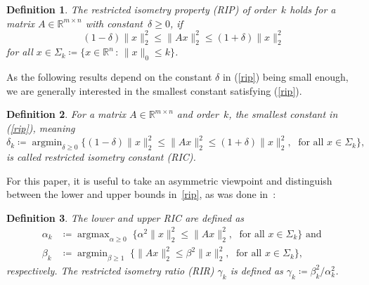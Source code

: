 \documentclass[journal]{IEEEtran}
\newtheorem{definition}{Definition}
\DeclareMathOperator*{\argmin}{argmin}
\DeclareMathOperator*{\argmax}{argmax}
\newcommand{\suchthat}{\,:\,}
\newcommand{\define}{\coloneqq}
\newcommand{\Norm}[2]{\lVert{#1}\rVert_{#2}}
\newcommand{\R}{\mathds{R}}
\begin{document}
\begin{definition}\label{ripdef}
  The \emph{restricted isometry property} (RIP) of order~$k$ holds for a
  matrix $A \in \R^{m \times n}$ with constant~$\delta \geq 0$, if
  \begin{equation}\label{rip}
    (1 - \delta) \Norm{x}{2}^2 \leq \Norm{Ax}{2}^2 \leq (1+\delta) \Norm{x}{2}^2
  \end{equation}
  for all $x \in \Sigma_k \define \{x \in \R^n \suchthat \Norm{x}{0} \leq k\}$.
\end{definition}

As the following results depend on the constant $\delta$ in (\ref{rip}) being
small enough, we are generally interested in the smallest constant satisfying
(\ref{rip}).

\begin{definition}\label{ricdef}
For a matrix $A \in \R^{m \times n}$ and order~$k$, the smallest constant in 
(\ref{rip}), meaning
\begin{equation}\label{ric}
 \delta_k \define \argmin_{\delta \geq 0} \{(1 - \delta) \Norm{x}{2}^2 \leq \Norm{Ax}{2}^2 \leq (1+\delta) \Norm{x}{2}^2 ,\; \text{ for all }x \in \Sigma_k\},
\end{equation}
is called \emph{restricted isometry constant} (RIC).
\end{definition}

For this paper, it is useful to take an asymmetric viewpoint and
distinguish between the lower and upper bounds in~\eqref{rip}, as was done
in~\cite{FL09}:

\begin{definition}\label{asymRIPdef}
 The \emph{lower} and \emph{upper RIC} are defined as
 \begin{align}
   \alpha_k & \define \argmax_{\alpha \geq 0}\; \{ \alpha^2 \Norm{x}{2}^2
   \leq \Norm{Ax}{2}^2,\; \text{ for all }x \in \Sigma_k\}\text{ and }\label{lowerRIP}\\
   \beta_k & \define \argmin_{\beta \geq 1}\; \{ \Norm{Ax}{2}^2 \leq \beta^2
   \Norm{x}{2}^2,\; \text{ for all }x \in \Sigma_k\},\label{upperRIP}
 \end{align}
 respectively. The \emph{restricted isometry ratio} (RIR) $\gamma_k$ is
 defined as $\gamma_k \define \beta_k^2 / \alpha_k^2$.
\end{definition}
\end{document}
